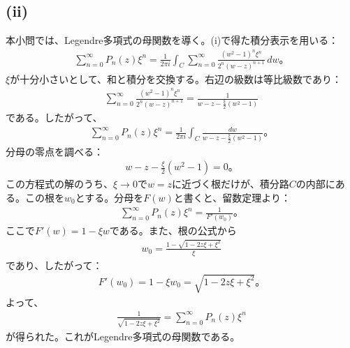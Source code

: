 \documentclass[platex,dvipdfmx,a4paper]{jsarticle}
\newcommand{\ssum}[3]{\sum_{#1=#2}^#3}
\begin{document}
  \subsection*{(ii)}
  本小問では、Legendre多項式の母関数を導く。(i)で得た積分表示を用いる：
  \begin{align*}
    \ssum{n}{0}{\infty}P_n(z)\xi^n=\frac{1}{2\pi i}\int_C\ssum{n}{0}{\infty}\frac{(w^2-1)^n\xi^n}{2^n(w-z)^{n+1}}\,dw。
  \end{align*}
  $\xi$が十分小さいとして、和と積分を交換する。右辺の級数は等比級数であり：
  \begin{align*}
    \ssum{n}{0}{\infty}\frac{(w^2-1)^n\xi^n}{2^n(w-z)^{n+1}}=\frac{1}{w-z-\frac{\xi}{2}(w^2-1)}
  \end{align*}
  である。したがって、
  \begin{align*}
    \ssum{n}{0}{\infty}P_n(z)\xi^n=\frac{1}{2\pi i}\int_C\frac{dw}{w-z-\frac{\xi}{2}(w^2-1)}。
  \end{align*}
  分母の零点を調べる：
  \begin{align*}
    w-z-\frac{\xi}{2}(w^2-1)=0。
  \end{align*}
  この方程式の解のうち、$\xi\to0$で$w=z$に近づく根だけが、積分路$C$の内部にある。この根を$w_0$とする。分母を$F(w)$と書くと、留数定理より：
  \begin{align*}
    \ssum{n}{0}{\infty}P_n(z)\xi^n=\frac{1}{F'(w_0)}。
  \end{align*}
  ここで$F'(w)=1-\xi w$である。また、根の公式から
  \begin{align*}
    w_0=\frac{1-\sqrt{1-2z\xi+\xi^2}}{\xi}
  \end{align*}
  であり、したがって：
  \begin{align*}
    F'(w_0)=1-\xi w_0=\sqrt{1-2z\xi+\xi^2}。
  \end{align*}
  よって、
  \begin{align*}
    \frac{1}{\sqrt{1-2z\xi+\xi^2}}=\ssum{n}{0}{\infty}P_n(z)\xi^n
  \end{align*}
  が得られた。これがLegendre多項式の母関数である。
  
\end{document}

